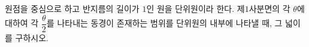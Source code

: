 원점을 중심으로 하고 반지름의 길이가 $1$인 원을 단위원이라 한다. 제$1$사분면의 각 $\theta$에 대하여 각 $\dfrac{\theta}{2}$를 나타내는 동경이 존재하는 범위를 단위원의 내부에 나타낼 때, 그 넓이를 구하시오. 
